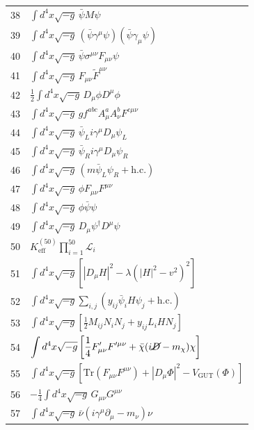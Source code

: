 \documentclass[11pt,a4paper]{article}
\begin{document}
\begin{longtable}{r p{}}
	38 & \(\displaystyle \int d^4x\sqrt{-g}\,\bar\psi M\psi\) \\
	39 & \(\displaystyle \int d^4x\sqrt{-g}\,(\bar\psi\gamma^\mu\psi)(\bar\psi\gamma_\mu\psi)\) \\
	40 & \(\displaystyle \int d^4x\sqrt{-g}\,\bar\psi\sigma^{\mu\nu}F_{\mu\nu}\psi\) \\
	41 & \(\displaystyle \int d^4x\sqrt{-g}\,F_{\mu\nu}\tilde{F}^{\mu\nu}\) \\
	42 & \(\displaystyle \frac12\int d^4x\sqrt{-g}\,D_\mu\phi D^\mu\phi\) \\
	43 & \(\displaystyle \int d^4x\sqrt{-g}\,g f^{abc}A^a_\mu A^b_\nu F^{c\mu\nu}\) \\
	44 & \(\displaystyle \int d^4x\sqrt{-g}\,\bar\psi_L i\gamma^\mu D_\mu\psi_L\) \\
	45 & \(\displaystyle \int d^4x\sqrt{-g}\,\bar\psi_R i\gamma^\mu D_\mu\psi_R\) \\
	46 & \(\displaystyle \int d^4x\sqrt{-g}\,(m\bar\psi_L\psi_R + \text{h.c.})\) \\
	47 & \(\displaystyle \int d^4x\sqrt{-g}\,\phi F_{\mu\nu}F^{\mu\nu}\) \\
	48 & \(\displaystyle \int d^4x\sqrt{-g}\,\phi\bar\psi\psi\) \\
	49 & \(\displaystyle \int d^4x\sqrt{-g}\,D_\mu\psi^\dagger D^\mu\psi\) \\
	50 & \(\displaystyle K^{(50)}_{\mathrm{eff}}\prod_{i=1}^{50}\mathcal{L}_i\) \\
	51 & \(\displaystyle \int d^4x\sqrt{-g}\left[|D_\mu H|^2 - \lambda(|H|^2 - v^2)^2\right]\) \\
	52 & \(\displaystyle \int d^4x\sqrt{-g}\sum_{i,j}\left(y_{ij}\bar\psi_i H\psi_j + \text{h.c.}\right)\) \\
	53 & \(\displaystyle \int d^4x\sqrt{-g}\left[\frac12 M_{ij}N_i N_j + y_{ij}L_i H N_j\right]\) \\
	54 & \(\displaystyle \int d^4x\sqrt{-g}\left[\frac14 F'_{\mu\nu}F'^{\mu\nu} + \bar\chi(i\cancel{D} - m_\chi)\chi\right]\) \\
	55 & \(\displaystyle \int d^4x\sqrt{-g}\left[\mathrm{Tr}(F_{\mu\nu}F^{\mu\nu}) + |D_\mu\Phi|^2 - V_{\text{GUT}}(\Phi)\right]\) \\
	56 & \(\displaystyle -\frac14\int d^4x\sqrt{-g}\,G_{\mu\nu}G^{\mu\nu}\) \\
	57 & \(\displaystyle \int d^4x\sqrt{-g}\,\bar\nu(i\gamma^\mu\partial_\mu - m_\nu)\nu\) \\

\end{longtable}
\end{document}
